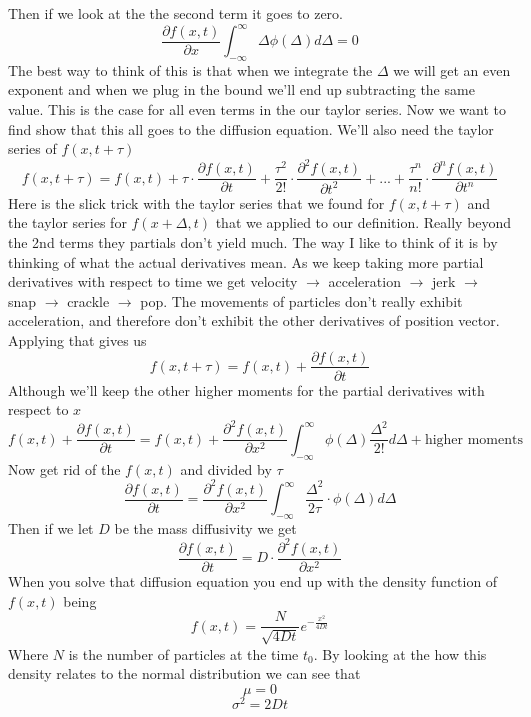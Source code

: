 \documentclass{article}
\begin{document}
Then if we look at the the second term it goes to zero.
$$
\frac{\partial f(x,t)}{\partial x} \int_{-\infty}^{\infty} \Delta \phi(\Delta) d\Delta = 0
$$
The best way to think of this is that when we integrate the $\Delta$ we will get an even exponent and when we plug in the bound we'll end up subtracting the same value. This is the case for all even terms in the our taylor series. 
\newline
\newline
Now we want to find show that this all goes to the diffusion equation. We'll also need the taylor series of $f(x,t + \tau)$
$$
f(x, t+\tau) = f(x,t) + \tau \cdot \frac{\partial f(x,t)}{\partial t} + \frac{\tau^2}{2!} \cdot \frac{\partial^2 f(x,t)}{\partial t^2} + ... + \frac{\tau^n}{n!} \cdot \frac{\partial ^n f(x,t)}{\partial t^n}
$$
Here is the slick trick with the taylor series that we found for $f(x,t+\tau)$ and the taylor series for $f(x+\Delta, t)$ that we applied to our definition. Really beyond the 2nd terms they partials don't yield much. The way I like to think of it is by thinking of what the actual derivatives mean. As we keep taking more partial derivatives with respect to time we get velocity $\rightarrow$ acceleration $\rightarrow$ jerk $\rightarrow$ snap $\rightarrow$ crackle $\rightarrow$ pop. The movements of particles don't really exhibit acceleration, and therefore don't exhibit the other derivatives of position vector.
\newline
\newline
Applying that gives us
$$
f(x,t+\tau) =  f(x,t) + \frac{\partial f(x,t)}{\partial t}
$$
Although we'll keep the other higher moments for the partial derivatives with respect to $x$
$$
f(x,t) + \frac{\partial f(x,t)}{\partial t} = f(x,t) + \frac{\partial^2f(x,t)}{\partial x^2} \int_{-\infty}^{\infty} \phi(\Delta) \frac{\Delta^2}{2!}d\Delta + \textrm{higher moments}
$$
Now get rid of the $f(x,t)$ and divided by $\tau$
$$
\frac{\partial f(x,t)}{\partial t} = \frac{\partial^2 f(x,t)}{\partial x^2} \int_{-\infty}^{\infty} \frac{\Delta^2}{2\tau} \cdot \phi(\Delta) d\Delta
$$
Then if we let $D$ be the mass diffusivity we get
$$
\frac{\partial f(x,t)}{\partial t} = D \cdot \frac{\partial^2 f(x,t)}{\partial x^2}
$$
When you solve that diffusion equation you end up with the density function of $f(x,t)$ being
$$
f(x,t) = \frac{N}{\sqrt{4Dt}}e^{-\frac{x^2}{4Dt}}
$$
Where $N$ is the number of particles at the time $t_0$. By looking at the how this density relates to the normal distribution we can see that
$$
\mu = 0
$$
$$
\sigma^2 = 2Dt
$$
\end{document}
